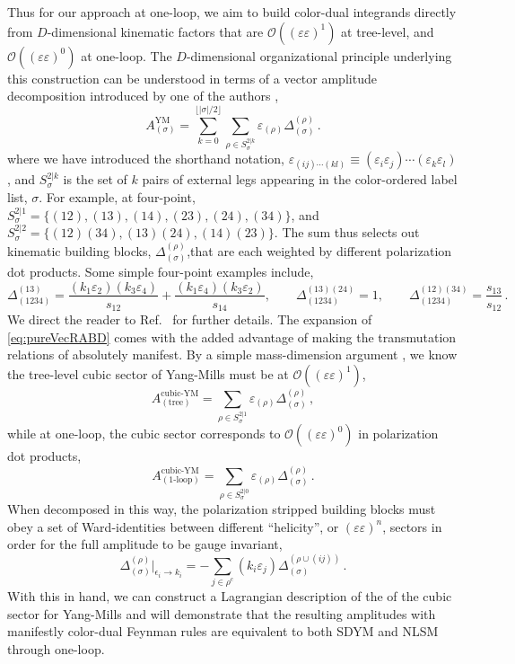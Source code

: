 \documentclass[11pt,letter]{article}
\def\be{\begin{equation}}
\def\ee{\end{equation}}
\begin{document}
Thus for our approach at one-loop, we aim to build color-dual integrands directly from $D$-dimensional kinematic factors that are $\mathcal{O}((\varepsilon\varepsilon)^1)$ at tree-level, and $\mathcal{O}((\varepsilon\varepsilon)^0)$ at one-loop. The $D$-dimensional organizational principle underlying this construction can be understood in terms of a vector amplitude decomposition introduced by one of the authors \cite{Pavao:2022kog},
\begin{equation}\label{eq:pureVecRABD}
A_{(\sigma)}^{\text{YM}} = \sum_{k=0}^{\lfloor |\sigma|/2\rfloor}\sum_{\rho \in S^{2|k}_{\sigma}}\varepsilon_{(\rho)} \Delta_{(\sigma)}^{(\rho)}\,.
\end{equation}
where we have introduced the shorthand notation, $\varepsilon_{(ij)\cdots (kl)} \equiv (\varepsilon_i \varepsilon_j)\cdots (\varepsilon_k \varepsilon_l)$, and  $S^{2|k}_{\sigma}$ is the set of $k$ pairs of external legs appearing in the color-ordered label list, $\sigma$. For example, at four-point, $S^{2|1}_{\sigma} =  \{(12),(13),(14),(23),(24),(34)\}$, and $S^{2|2}_{\sigma} =  \{(12)(34),(13)(24),(14)(23)\}$. The sum thus selects out kinematic building blocks, $\Delta_{(\sigma)}^{(\rho)}$,that are each weighted by different polarization dot products. Some simple four-point examples include, 
\be
\Delta^{(13)}_{(1234)} =\frac{(k_1 \varepsilon_2)(k_{3} \varepsilon_4)}{s_{12}}+\frac{(k_1 \varepsilon_4)(k_{3} \varepsilon_2)}{s_{14}}, \qquad \Delta^{(13)(24)}_{(1234)} =1, \qquad \Delta^{(12)(34)}_{(1234)} =\frac{s_{13}}{s_{12}}\,. 
\ee
We direct the reader to Ref.~\cite{Pavao:2022kog} for further details. The expansion of \cref{eq:pureVecRABD} comes with the added advantage of making the transmutation relations of \cite{Cheung:2017ems} absolutely manifest. By a simple mass-dimension argument \cite{ElvangHuangReview}, we know the tree-level cubic sector of Yang-Mills must be at
$\mathcal{O}((\varepsilon\varepsilon)^1)$,
\begin{equation}
A_{(\text{tree})}^{\text{cubic-YM}} = \sum_{\rho \in S^{2|1}_{\sigma}}\varepsilon_{(\rho)} \Delta_{(\sigma)}^{(\rho)}\, ,
\end{equation}
while at one-loop, the cubic sector corresponds to
$\mathcal{O}((\varepsilon\varepsilon)^0)$ in polarization dot
products,
\begin{equation}
A_{(\text{1-loop})}^{\text{cubic-YM}} = \sum_{\rho \in S^{2|0}_{\sigma}}\varepsilon_{(\rho)} \Delta_{(\sigma)}^{(\rho)}\,.
\end{equation}
When decomposed in this way, the polarization stripped building blocks
must obey a set of Ward-identities between different ``helicity'', or
$(\varepsilon \varepsilon)^n$, sectors in order for the full amplitude
to be gauge invariant,
 \begin{equation}\label{eq:GIrelA}
\Delta_{(\sigma)}^{(\rho)}\Big|_{\epsilon_i\rightarrow k_i} =-
\sum_{j \in \rho^c} (k_i \varepsilon_j)\Delta_{(\sigma )}^{(\rho\cup (ij))} \,.
\end{equation}
With this in hand, we can construct a Lagrangian description of the of
the cubic sector for Yang-Mills and will demonstrate that the
resulting amplitudes with manifestly color-dual Feynman rules are
equivalent to both SDYM and NLSM through one-loop.
\end{document}
